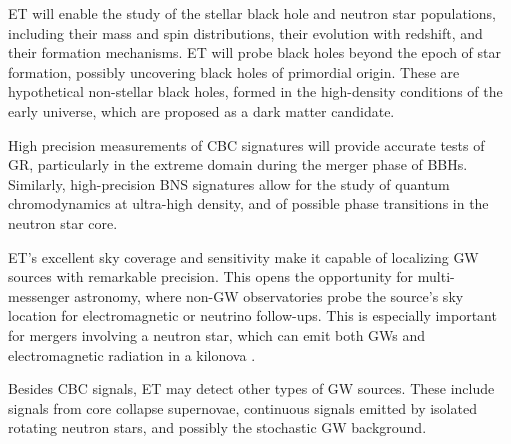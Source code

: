 ET will enable the study of the stellar black hole and neutron star populations, including their mass and spin distributions, their evolution with redshift, and their formation mechanisms. ET will probe black holes beyond the epoch of star formation, possibly uncovering black holes of primordial origin. These are hypothetical non-stellar black holes, formed in the high-density conditions of the early universe, which are proposed as a dark matter candidate.

High precision measurements of CBC signatures will provide accurate tests of GR, particularly in the extreme domain during the merger phase of BBHs. Similarly, high-precision BNS signatures allow for the study of quantum chromodynamics at ultra-high density, and of possible phase transitions in the neutron star core.

ET's excellent sky coverage and sensitivity make it capable of localizing GW sources with remarkable precision. This opens the opportunity for multi-messenger astronomy, where non-GW observatories probe the source's sky location for electromagnetic or neutrino follow-ups. This is especially important for mergers involving a neutron star, which can emit both GWs and electromagnetic radiation in a kilonova \cite{Abbott_2017_kilonova}. 

Besides CBC signals, ET may detect other types of GW sources. These include signals from core collapse supernovae, continuous signals emitted by isolated rotating neutron stars, and possibly the stochastic GW background.

